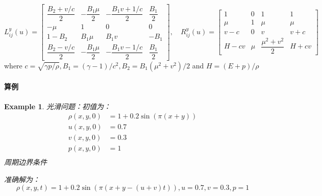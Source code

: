 \documentclass{article}
\newtheorem{example}{Example}
\numberwithin{equation}{subsection}    %
\begin{document}
\begin{appendix}
    \begin{equation}
        L_{i j}^{y}(u)=\begin{bmatrix}
            \dfrac{B_{2}+v / c}{2} & -\dfrac{B_{1} \mu}{2} & -\dfrac{B_{1} v+1 / c}{2} & \dfrac{B_{1}}{2} \\
            -\mu                   & 1                     & 0                         & 0                \\
            1-B_{2}                & B_{1} \mu             & B_{1} v                   & -B_{1}           \\
            \dfrac{B_{2}-v / c}{2} & -\dfrac{B_{1} \mu}{2} & -\dfrac{B_{1} v-1 / c}{2} & \dfrac{B_{1}}{2}
        \end{bmatrix},\quad
        R_{i j}^{y}(u)=\begin{bmatrix}
            1     & 0   & 1                        & 1     \\
            \mu   & 1   & \mu                      & \mu   \\
            v-c   & 0   & v                        & v+c   \\
            H-c v & \mu & \dfrac{\mu^{2}+v^{2}}{2} & H+c v
        \end{bmatrix}
    \end{equation}
    where  $c=\sqrt{\gamma p / \rho}, B_{1}=(\gamma-1) / c^{2}, B_{2}=B_{1}\left(\mu^{2}+v^{2}\right) / 2$  and  $H=(E+p) / \rho$
    \paragraph{算例}
    \begin{example}
        光滑问题：初值为：
        \begin{equation}
            \begin{aligned}
                \rho(x,y,0) & = 1+0.2\sin(\pi(x+y)) \\
                u(x,y,0)    & = 0.7                 \\
                v(x,y,0)    & = 0.3                 \\
                p(x,y,0)    & = 1                   \\
            \end{aligned}
        \end{equation}
        周期边界条件

        准确解为：
        \begin{equation}
            \rho(x,y,t) = 1+0.2\sin(\pi(x+y-(u+v)t)),u=0.7,v=0.3,p=1
        \end{equation}
    \end{example}


\end{appendix}
\end{document}
